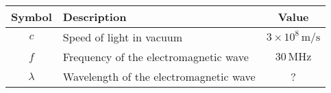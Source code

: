 

\begin{tabular}{|c|l|c|}
\hline
Symbol & Description                               & Value                    \\ \hline
\(c\)    & Speed of light in vacuum                  & \(3 \times 10^8 \, \text{m/s}\) \\
\(f\)    & Frequency of the electromagnetic wave    & \(30 \, \text{MHz}\)     \\
\(\lambda\) & Wavelength of the electromagnetic wave   & ?                        \\ \hline
\end{tabular}


